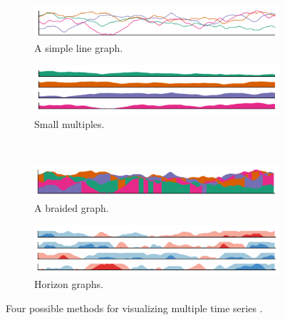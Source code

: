 \documentclass{article} %
\begin{document}
\begin{figure}
        \centering
        \begin{subfigure}[b]{0.4\textwidth}
                \includegraphics[width=\textwidth]{figures/ts_simplelinegraph.png}
                \caption{A simple line graph.}
                \label{fig:ts_simple}
        \end{subfigure}
        \begin{subfigure}[b]{0.4\textwidth}
                \includegraphics[width=\textwidth]{figures/ts_smallmultiples.png}
                \caption{Small multiples.}
                \label{fig:ts_smmult}
        \end{subfigure}
        \\
        \begin{subfigure}[b]{0.4\textwidth}
                \includegraphics[width=\textwidth]{figures/ts_braidedgraph.png}
                \caption{A braided graph.}
                \label{fig:ts_braid}
        \end{subfigure}
        \begin{subfigure}[b]{0.4\textwidth}
                \includegraphics[width=\textwidth]{figures/ts_horizongraphs.png}
                \caption{Horizon graphs.}
                \label{fig:ts_horizon}
        \end{subfigure}
        \caption{Four possible methods for visualizing multiple time series \cite{javed2010}.}
        \label{fig:ts_compare}
\end{figure}
\end{document}
